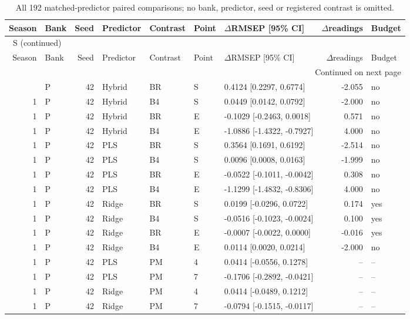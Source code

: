 \documentclass[10pt,a4paper]{article}
\renewcommand{\thetable}{S\arabic{table}}
\begin{document}
\begingroup\footnotesize
\setlength{\tabcolsep}{3.5pt}
\renewcommand{\arraystretch}{1.10}
\begin{longtable}{rlrllllrl}
\caption{All 192 matched-predictor paired comparisons; no bank, predictor, seed or registered contrast is omitted.}\label{tab:v2paired}\\
\toprule
Season & Bank & Seed & Predictor & Contrast & Point & $\Delta$RMSEP [95\% CI] & $\Delta$readings & Budget \\
\midrule
\endfirsthead
\multicolumn{9}{l}{\tablename~\thetable{} (continued)}\\
\toprule
Season & Bank & Seed & Predictor & Contrast & Point & $\Delta$RMSEP [95\% CI] & $\Delta$readings & Budget \\
\midrule
\endhead
\midrule
\multicolumn{9}{r}{Continued on next page}\\
\endfoot
\bottomrule
\endlastfoot
1 & P & 42 & Hybrid & BR & S & 0.4124 [0.2297, 0.6774] & -2.055 & no \\
1 & P & 42 & Hybrid & B4 & S & 0.0449 [0.0142, 0.0792] & -2.000 & no \\
1 & P & 42 & Hybrid & BR & E & -0.1029 [-0.2463, 0.0018] & 0.571 & no \\
1 & P & 42 & Hybrid & B4 & E & -1.0886 [-1.4322, -0.7927] & 4.000 & no \\
1 & P & 42 & PLS & BR & S & 0.3564 [0.1691, 0.6192] & -2.514 & no \\
1 & P & 42 & PLS & B4 & S & 0.0096 [0.0008, 0.0163] & -1.999 & no \\
1 & P & 42 & PLS & BR & E & -0.0522 [-0.1011, -0.0042] & 0.308 & no \\
1 & P & 42 & PLS & B4 & E & -1.1299 [-1.4832, -0.8306] & 4.000 & no \\
1 & P & 42 & Ridge & BR & S & 0.0199 [-0.0296, 0.0722] & 0.174 & yes \\
1 & P & 42 & Ridge & B4 & S & -0.0516 [-0.1023, -0.0024] & 0.100 & yes \\
1 & P & 42 & Ridge & BR & E & -0.0007 [-0.0022, 0.0000] & -0.016 & yes \\
1 & P & 42 & Ridge & B4 & E & 0.0114 [0.0020, 0.0214] & -2.000 & no \\
1 & P & 42 & PLS & PM & 4 & 0.0414 [-0.0556, 0.1278] & -- & -- \\
1 & P & 42 & PLS & PM & 7 & -0.1706 [-0.2892, -0.0421] & -- & -- \\
1 & P & 42 & Ridge & PM & 4 & 0.0414 [-0.0489, 0.1212] & -- & -- \\
1 & P & 42 & Ridge & PM & 7 & -0.0794 [-0.1515, -0.0117] & -- & -- \\

\end{longtable}
\end{document}
